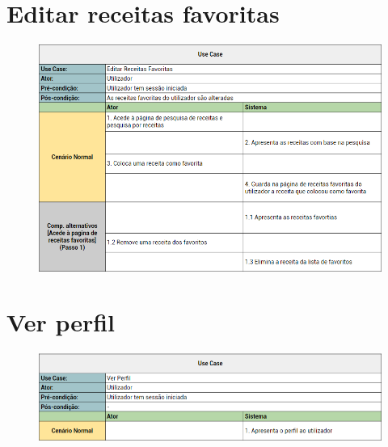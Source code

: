 \documentclass[a4paper]{report}
\begin{document}
    \section{Editar receitas favoritas}
        \begin{figure}[H]
        \centering
            \includegraphics[width=\textwidth]{images/usecases/editar_receitas_favoritas.png}
        \end{figure}

    \section{Ver perfil}
        \begin{figure}[H]
        \centering
            \includegraphics[width=\textwidth]{images/usecases/ver_perfil.png}
        \end{figure}
\end{document}
